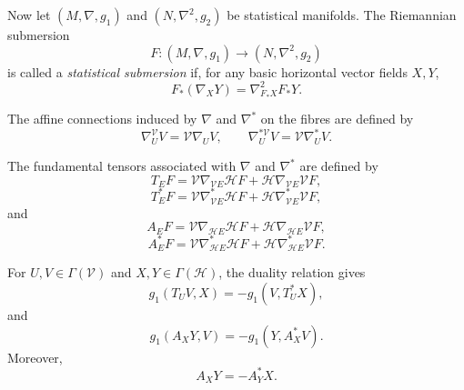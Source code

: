 \documentclass[10pt,a4paper]{article}
\theoremstyle{definition}
\theoremstyle{remark}
\numberwithin{equation}{section}
\begin{document}
Now let $(M,\nabla,g_1)$ and $(N,\nabla^{2},g_2)$ be statistical
manifolds. The Riemannian submersion
\[
F:(M,\nabla,g_1)\longrightarrow(N,\nabla^{2},g_2)
\]
is called a \emph{statistical submersion} if, for any basic horizontal
vector fields $X,Y$,
\begin{equation}
F_{*}(\nabla_XY)
=
\nabla^{2}_{F_{*}X}F_{*}Y.
\label{eq-stat-submersion}
\end{equation}

The affine connections induced by $\nabla$ and $\nabla^{*}$ on the fibres
are defined by
\begin{equation}
\nabla^{\mathcal V}_{U}V
=
\mathcal V\nabla_UV,
\qquad
\nabla^{*\mathcal V}_{U}V
=
\mathcal V\nabla^{*}_{U}V.
\label{eq-induced-fibre-connections}
\end{equation}

The fundamental tensors associated with $\nabla$ and $\nabla^{*}$ are
defined by
\begin{equation}
T_EF
=
\mathcal V\nabla_{\mathcal VE}\mathcal HF
+
\mathcal H\nabla_{\mathcal VE}\mathcal VF,
\label{eq-T}
\end{equation}
\begin{equation}
T^{*}_EF
=
\mathcal V\nabla^{*}_{\mathcal VE}\mathcal HF
+
\mathcal H\nabla^{*}_{\mathcal VE}\mathcal VF,
\label{eq-Tstar}
\end{equation}
and
\begin{equation}
A_EF
=
\mathcal V\nabla_{\mathcal HE}\mathcal HF
+
\mathcal H\nabla_{\mathcal HE}\mathcal VF,
\label{eq-A}
\end{equation}
\begin{equation}
A^{*}_EF
=
\mathcal V\nabla^{*}_{\mathcal HE}\mathcal HF
+
\mathcal H\nabla^{*}_{\mathcal HE}\mathcal VF.
\label{eq-Astar}
\end{equation}

For $U,V\in\Gamma(\mathcal V)$ and
$X,Y\in\Gamma(\mathcal H)$, the duality relation gives
\begin{equation}
g_1(T_UV,X)
=
-g_1(V,T^{*}_UX),
\label{eq-dual-T}
\end{equation}
and
\begin{equation}
g_1(A_XY,V)
=
-g_1(Y,A^{*}_XV).
\label{eq-dual-A}
\end{equation}
Moreover,
\begin{equation}
A_XY=-A^{*}_YX.
\label{eq-A-Astar}
\end{equation}
\end{document}
